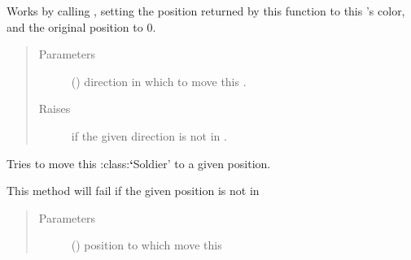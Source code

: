\documentclass[letterpaper,10pt,english,openany,oneside]{sphinxmanual}
\begin{document}
\begin{fulllineitems}
\begin{fulllineitems}
Works by calling {\hyperref[\detokenize{neutron:neutron.NeutronBoard.furthest_empty_spot}]{}}, setting
the position returned by this function to this {\hyperref[\detokenize{neutron:neutron.Soldier}]{}}’s
color, and the original position to 0.
\begin{quote}\begin{description}
\item[{Parameters}] \leavevmode
{} () \textendash{} direction in which to move this {\hyperref[\detokenize{neutron:neutron.Soldier}]{}}.

\item[{Raises}] \leavevmode
{} \textendash{} if the given direction is not in {\hyperref[\detokenize{neutron:neutron.Soldier.possible_directions}]{}}.

\end{description}\end{quote}

\end{fulllineitems}


\begin{fulllineitems}
\label{\detokenize{neutron:neutron.Soldier.move_to_pos}}
Tries to move this :class:{\color{red}\bfseries{}{}`}Soldier’ to a given position.

This method will fail if the given position is not in
{\hyperref[\detokenize{neutron:neutron.Soldier.possible_moves}]{}}
\begin{quote}\begin{description}
\item[{Parameters}] \leavevmode
{} ({\hyperref[\detokenize{util:util.Vec}]{}}) \textendash{} position to which move this {\hyperref[\detokenize{neutron:neutron.Soldier}]{}}


\end{description}
\end{quote}
\end{fulllineitems}
\end{fulllineitems}
\end{document}
